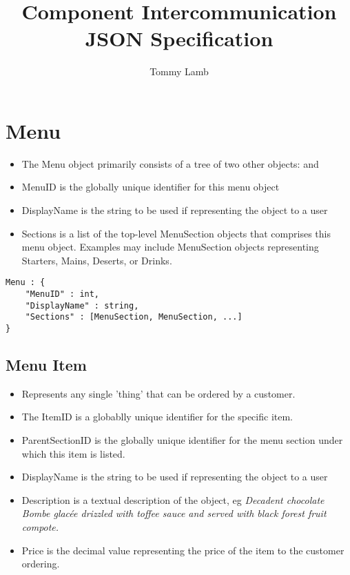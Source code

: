\documentclass[12pt, a4paper]{article}
\begin{document}
\title{Component Intercommunication JSON Specification}
\author{Tommy Lamb}

\maketitle

\tableofcontents
\pagebreak

\section{Menu}

\begin{itemize}
\item The Menu object primarily consists of a tree of two other objects:  and 

\item MenuID is the globally unique identifier for this menu object

\item DisplayName is the string to be used if representing the object to a user

\item Sections is a list of the top-level MenuSection objects that comprises this menu object. Examples may include MenuSection objects representing Starters, Mains, Deserts, or Drinks.
\end{itemize}

\begin{verbatim}
Menu : {
	"MenuID" : int,
	"DisplayName" : string,
	"Sections" : [MenuSection, MenuSection, ...]
}
\end{verbatim}


\subsection{Menu Item} \label{subsec:MenuItem}

\begin{itemize}
\item Represents any single 'thing' that can be ordered by a customer.
\item The ItemID is a globablly unique identifier for the specific item.
\item ParentSectionID is the globally unique identifier for the menu section under which this item is listed.
\item DisplayName is the string to be used if representing the object to a user
\item Description is a textual description of the object, eg \textit{Decadent chocolate Bombe glacée drizzled with toffee sauce and served with black forest fruit compote.}
\item Price is the decimal value representing the price of the item to the customer ordering.
\end{itemize}
\end{document}
